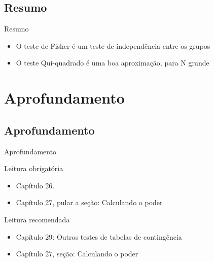 \documentclass{beamer}
\begin{document}


\subsection{Resumo}

\begin{frame}{\scriptsize Resumo}
  \begin{itemize}
    \footnotesize
  \item O teste de Fisher é um teste de independência entre os grupos
    \bigskip
  \item O teste Qui-quadrado é uma boa aproximação, para N grande
  \end{itemize}
\end{frame}

\section{Aprofundamento}

\subsection{Aprofundamento}

\begin{frame}{\scriptsize Aprofundamento}
  \begin{block}{Leitura obrigatória}
    \begin{itemize}
      \footnotesize
    \item Capítulo 26.
    \item Capítulo 27, pular a seção: Calculando o poder
    \end{itemize}
  \end{block}
  \begin{block}{Leitura recomendada}
    \begin{itemize}
      \scriptsize
    \item Capítulo 29: Outros testes de tabelas de contingência
    \item Capítulo 27, seção: Calculando o poder
    \end{itemize}
  \end{block}
\end{frame}
\end{document}

